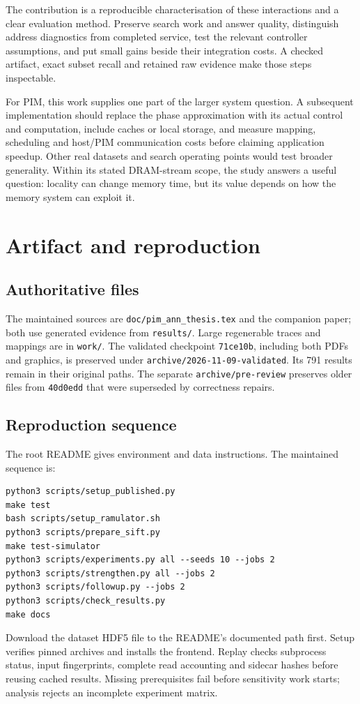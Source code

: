 \documentclass[11pt,a4paper]{report}
\begin{document}
The contribution is a reproducible characterisation of these interactions and a clear evaluation method. Preserve search work and answer quality, distinguish address diagnostics from completed service, test the relevant controller assumptions, and put small gains beside their integration costs. A checked artifact, exact subset recall and retained raw evidence make those steps inspectable.

For PIM, this work supplies one part of the larger system question. A subsequent implementation should replace the phase approximation with its actual control and computation, include caches or local storage, and measure mapping, scheduling and host/PIM communication costs before claiming application speedup. Other real datasets and search operating points would test broader generality. Within its stated DRAM-stream scope, the study answers a useful question: locality can change memory time, but its value depends on how the memory system can exploit it.

\appendix
\chapter{Artifact and reproduction}
\section{Authoritative files}
The maintained sources are \texttt{doc/pim\_ann\_thesis.tex} and the companion paper; both use generated evidence from \texttt{results/}. Large regenerable traces and mappings are in \texttt{work/}. The validated checkpoint \texttt{71ce10b}, including both PDFs and graphics, is preserved under \texttt{archive/2026-11-09-validated}. Its 791 results remain in their original paths. The separate \texttt{archive/pre-review} preserves older files from \texttt{40d0edd} that were superseded by correctness repairs.

\section{Reproduction sequence}
The root README gives environment and data instructions. The maintained sequence is:
\begin{lstlisting}
python3 scripts/setup_published.py
make test
bash scripts/setup_ramulator.sh
python3 scripts/prepare_sift.py
make test-simulator
python3 scripts/experiments.py all --seeds 10 --jobs 2
python3 scripts/strengthen.py all --jobs 2
python3 scripts/followup.py --jobs 2
python3 scripts/check_results.py
make docs
\end{lstlisting}
Download the dataset HDF5 file to the README's documented path first. Setup verifies pinned archives and installs the frontend. Replay checks subprocess status, input fingerprints, complete read accounting and sidecar hashes before reusing cached results. Missing prerequisites fail before sensitivity work starts; analysis rejects an incomplete experiment matrix.
\end{document}
